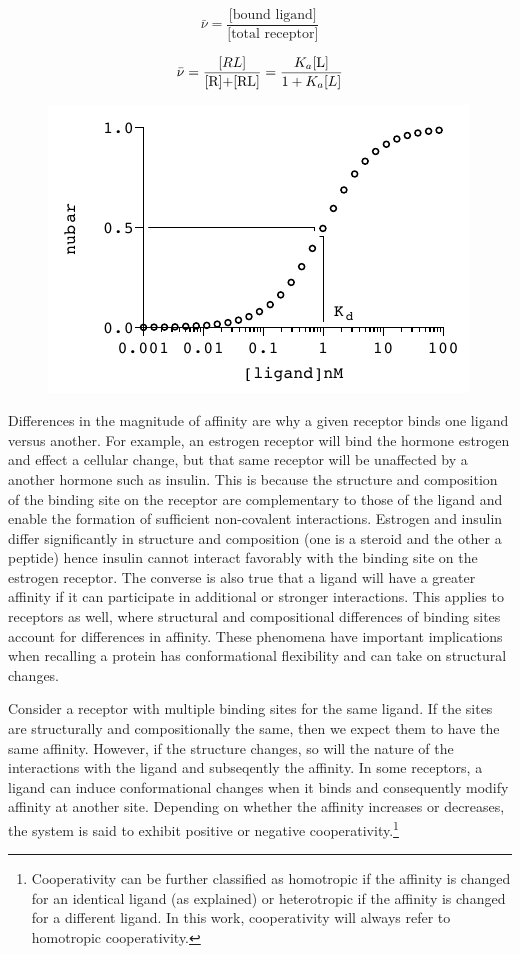 \documentclass{article}
\numberwithin{equation}{section}
\begin{document}
\begin{equation}
	\bar{\nu} = \frac{\text{[bound ligand]}}{\text{[total receptor]}}
\end{equation}

\begin{equation}
	\bar{\nu} = \frac{\text[RL]}{\text{[R]+[RL]}} = \frac{K_a \text{[L]}}{1+K_a \text[L]}
\end{equation}

\begin{figure}
	\centering
	\includegraphics{iostherm_arrows}
\end{figure}

Differences in the magnitude of affinity are why a given receptor binds one ligand versus another. For example, an estrogen receptor will bind the hormone estrogen and effect a cellular change, but that same receptor will be unaffected by a another hormone such as insulin. This is because the structure and composition of the binding site on the receptor are complementary to those of the ligand and enable the formation of sufficient non-covalent interactions. Estrogen and insulin differ significantly in structure and composition (one is a steroid and the other a peptide) hence insulin cannot interact favorably with the binding site on the estrogen receptor. The converse is also true that a ligand will have a greater affinity if it can participate in additional or stronger interactions. This applies to receptors as well, where structural and compositional differences of binding sites account for differences in affinity. These phenomena have important implications when recalling a protein has conformational flexibility and can take on structural changes.

Consider a receptor with multiple binding sites for the same ligand. If the sites are structurally and compositionally the same, then we expect them to have the same affinity. However, if the structure changes, so will the nature of the interactions with the ligand and subseqently the affinity. In some receptors, a ligand can induce conformational changes when it binds and consequently modify affinity at another site. Depending on whether the affinity increases or decreases, the system is said to exhibit positive or negative cooperativity.\footnote{Cooperativity can be further classified as homotropic if the affinity is changed for an identical ligand (as explained) or heterotropic if the affinity is changed for a different ligand. In this work, cooperativity will always refer to homotropic cooperativity.} 
\end{document}
